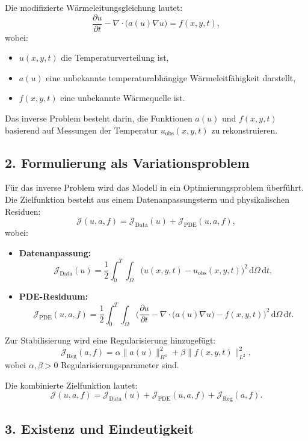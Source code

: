 Die modifizierte Wärmeleitungsgleichung lautet:
\[
\frac{\partial u}{\partial t} - \nabla \cdot \big(a(u) \nabla u\big) = f(x, y, t),
\]
wobei:
\begin{itemize}
	\item \(u(x, y, t)\) die Temperaturverteilung ist,
	\item \(a(u)\) eine unbekannte temperaturabhängige Wärmeleitfähigkeit darstellt,
	\item \(f(x, y, t)\) eine unbekannte Wärmequelle ist.
\end{itemize}

Das inverse Problem besteht darin, die Funktionen \(a(u)\) und \(f(x, y, t)\) basierend auf Messungen der Temperatur \(u_\text{obs}(x, y, t)\) zu rekonstruieren.

\subsection*{2. Formulierung als Variationsproblem}

Für das inverse Problem wird das Modell in ein Optimierungsproblem überführt. Die Zielfunktion besteht aus einem Datenanpassungsterm und physikalischen Residuen:
\[
\mathcal{J}(u, a, f) = \mathcal{J}_\text{Data}(u) + \mathcal{J}_\text{PDE}(u, a, f),
\]
wobei:
\begin{itemize}
	\item \textbf{Datenanpassung:}
	\[
	\mathcal{J}_\text{Data}(u) = \frac{1}{2} \int_0^T \int_\Omega \big(u(x, y, t) - u_\text{obs}(x, y, t)\big)^2 \, \mathrm{d}\Omega \, \mathrm{d}t,
	\]
	\item \textbf{PDE-Residuum:}
	\[
	\mathcal{J}_\text{PDE}(u, a, f) = \frac{1}{2} \int_0^T \int_\Omega \bigg(\frac{\partial u}{\partial t} - \nabla \cdot \big(a(u) \nabla u\big) - f(x, y, t)\bigg)^2 \, \mathrm{d}\Omega \, \mathrm{d}t.
	\]
\end{itemize}

Zur Stabilisierung wird eine Regularisierung hinzugefügt:
\[
\mathcal{J}_\text{Reg}(a, f) = \alpha \|a(u)\|_{H^1}^2 + \beta \|f(x, y, t)\|_{L^2}^2,
\]
wobei \(\alpha, \beta > 0\) Regularisierungsparameter sind.

Die kombinierte Zielfunktion lautet:
\[
\mathcal{J}(u, a, f) = \mathcal{J}_\text{Data}(u) + \mathcal{J}_\text{PDE}(u, a, f) + \mathcal{J}_\text{Reg}(a, f).
\]

\subsection*{3. Existenz und Eindeutigkeit}

